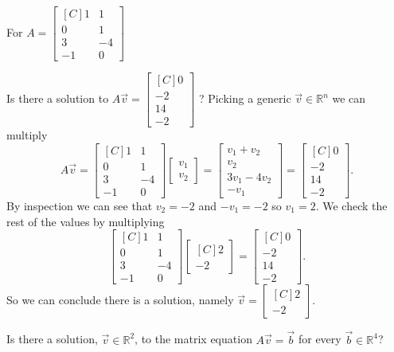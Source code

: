 \begin{example}
For $A=\begin{bmatrix*}[C]
1  & 1 \\
0  & 1 \\
3  & -4\\
-1 & 0 
\end{bmatrix*}$\\
\begin{inparaenum}[a.)]
\item Is there a solution to 
$A\vec{v}=\begin{bmatrix*}[C] 0 \\ -2 \\ 14 \\ -2 \end{bmatrix*}$ ? 
Picking a generic  $\vec{v}\in\mathbb{R}^n$ we can multiply
\[
A\vec{v}=
\begin{bmatrix*}[C]
1  & 1 \\
0  & 1 \\
3  & -4\\
-1 & 0 
\end{bmatrix*}\begin{bmatrix}v_1\\v_2\end{bmatrix}
=\begin{bmatrix*}
v_1+v_2\\
v_2\\
3v_1-4v_2\\
-v_1
\end{bmatrix*}
=\begin{bmatrix*}[C] 0 \\ -2 \\ 14 \\ -2 \end{bmatrix*}.
\]
By inspection we can see that $v_2=-2$ and $-v_1=-2$ so $v_1=2$. We check the
rest of the values by multiplying
\[
\begin{bmatrix*}[C]
1  & 1 \\
0  & 1 \\
3  & -4\\
-1 & 0 
\end{bmatrix*}\begin{bmatrix*}[C]2\\-2\end{bmatrix*}
=\begin{bmatrix*}[C] 0 \\ -2 \\ 14 \\ -2 \end{bmatrix*}.
\]
So we can conclude there is a solution, namely 
$\vec{v}=\begin{bmatrix*}[C]2\\-2\end{bmatrix*}$.\\
%
\item Is there a solution, $\vec{v} \in \mathbb{R}^2$, to the 
matrix equation $A\vec{v}=\vec{b}$ 
for every $\vec{b} \in \mathbb{R}^4$?


\end{inparaenum}
\end{example}
